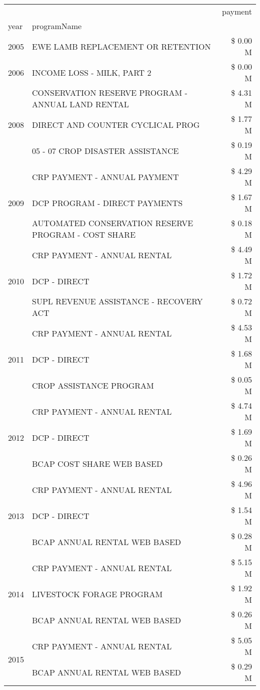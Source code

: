 \begin{tabular}{llr}
\toprule
 &  & payment \\
year & programName &  \\
\midrule
2005 & EWE LAMB REPLACEMENT OR RETENTION & \$ 0.00 M \\
\cline{1-3}
2006 & INCOME LOSS - MILK, PART 2 & \$ 0.00 M \\
\cline{1-3}
\multirow[t]{3}{*}{2008} & CONSERVATION RESERVE PROGRAM - ANNUAL LAND RENTAL & \$ 4.31 M \\
 & DIRECT AND COUNTER CYCLICAL PROG & \$ 1.77 M \\
 & 05 - 07 CROP DISASTER ASSISTANCE & \$ 0.19 M \\
\cline{1-3}
\multirow[t]{3}{*}{2009} & CRP PAYMENT - ANNUAL PAYMENT & \$ 4.29 M \\
 & DCP PROGRAM - DIRECT PAYMENTS & \$ 1.67 M \\
 & AUTOMATED CONSERVATION RESERVE PROGRAM - COST SHARE & \$ 0.18 M \\
\cline{1-3}
\multirow[t]{3}{*}{2010} & CRP PAYMENT - ANNUAL RENTAL & \$ 4.49 M \\
 & DCP - DIRECT & \$ 1.72 M \\
 & SUPL REVENUE ASSISTANCE - RECOVERY ACT & \$ 0.72 M \\
\cline{1-3}
\multirow[t]{3}{*}{2011} & CRP PAYMENT - ANNUAL RENTAL & \$ 4.53 M \\
 & DCP - DIRECT & \$ 1.68 M \\
 & CROP ASSISTANCE PROGRAM & \$ 0.05 M \\
\cline{1-3}
\multirow[t]{3}{*}{2012} & CRP PAYMENT - ANNUAL RENTAL & \$ 4.74 M \\
 & DCP - DIRECT & \$ 1.69 M \\
 & BCAP COST SHARE WEB BASED & \$ 0.26 M \\
\cline{1-3}
\multirow[t]{3}{*}{2013} & CRP PAYMENT - ANNUAL RENTAL & \$ 4.96 M \\
 & DCP - DIRECT & \$ 1.54 M \\
 & BCAP ANNUAL RENTAL WEB BASED & \$ 0.28 M \\
\cline{1-3}
\multirow[t]{3}{*}{2014} & CRP PAYMENT - ANNUAL RENTAL & \$ 5.15 M \\
 & LIVESTOCK FORAGE PROGRAM & \$ 1.92 M \\
 & BCAP ANNUAL RENTAL WEB BASED & \$ 0.26 M \\
\cline{1-3}
\multirow[t]{3}{*}{2015} & CRP PAYMENT - ANNUAL RENTAL & \$ 5.05 M \\
 & BCAP ANNUAL RENTAL WEB BASED & \$ 0.29 M \\

\end{tabular}
